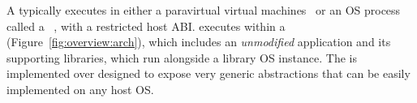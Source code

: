 \label{sec:overview:libos:arch}

A \libos{} typically executes in either a paravirtual virtual machines~\cite{unikernels,osv}
or an OS process called a \emph{\picoproc{}}~\cite{porter11drawbridge,baumann13bascule}, with a restricted host ABI.
\graphene{} executes within a \picoproc{} (Figure~\ref{fig:overview:arch}),
which includes an {\em unmodified} application and its supporting libraries, which run alongside a library OS instance.
The \libos{} is implemented over \thehostabi{} designed to expose very generic abstractions that can be easily implemented on any host OS.



